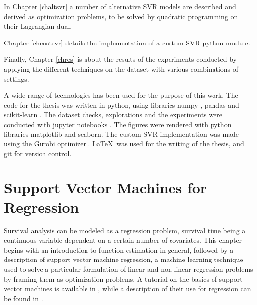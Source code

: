 \documentclass[12pt]{report}
\begin{document}
In Chapter \ref{chaltsvr} a number of alternative SVR models are described and derived as optimization problems, to be solved by quadratic programming on their Lagrangian dual.

Chapter \ref{chcustsvr} details the implementation of a custom SVR python module.

Finally, Chapter \ref{chres} is about the results of the experiments conducted by applying the different techniques on the dataset with various combinations of settings.
\newpage

A wide range of technologies has been used for the purpose of this work. The code for the thesis was written in python, using libraries numpy \cite{numpy}, pandas \cite{pandas} and scikit-learn \cite{sklearn}. The dataset checks, explorations and the experiments were conducted with jupyter notebooks \cite{jupyter}. The figures were rendered with python libraries matplotlib \cite{matplotlib} and seaborn. The custom SVR implementation was made using the Gurobi optimizer \cite{gurobi}. \LaTeX\ was used for the writing of the thesis, and git for version control.

\chapter{Support Vector Machines for Regression}
\label{chsvm}
Survival analysis can be modeled as a regression problem, survival time being a continuous variable dependent on a certain number of covariates. This chapter begins with an introduction to function estimation in general, followed by a description of support vector machine regression, a machine learning technique used to solve a particular formulation of linear and non-linear regression problems by framing them as optimization problems. A tutorial on the basics of support vector machines is available in \cite{svmtutorial}, while a description of their use for regression can be found in \cite{svregtutorial}.
\end{document}
